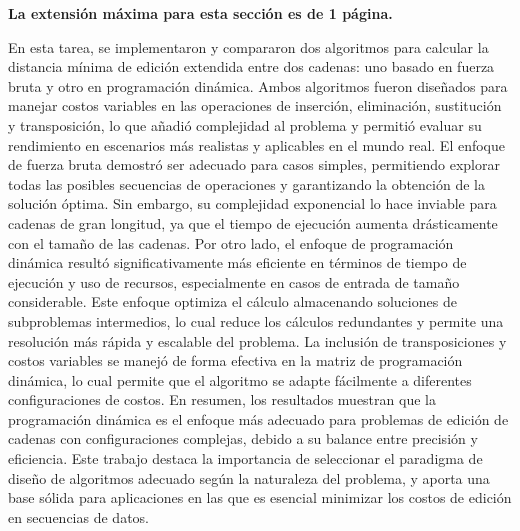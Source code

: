 \begin{mdframed}
    \textbf{La extensión máxima para esta sección es de 1 página.}
\end{mdframed}

En esta tarea, se implementaron y compararon dos algoritmos para calcular la distancia mínima de edición extendida entre dos cadenas: uno basado en fuerza bruta y otro en programación dinámica. Ambos algoritmos fueron diseñados para manejar costos variables en las operaciones de inserción, eliminación, sustitución y transposición, lo que añadió complejidad al problema y permitió evaluar su rendimiento en escenarios más realistas y aplicables en el mundo real.
El enfoque de fuerza bruta demostró ser adecuado para casos simples, permitiendo explorar todas las posibles secuencias de operaciones y garantizando la obtención de la solución óptima. Sin embargo, su complejidad exponencial lo hace inviable para cadenas de gran longitud, ya que el tiempo de ejecución aumenta drásticamente con el tamaño de las cadenas.
Por otro lado, el enfoque de programación dinámica resultó significativamente más eficiente en términos de tiempo de ejecución y uso de recursos, especialmente en casos de entrada de tamaño considerable. Este enfoque optimiza el cálculo almacenando soluciones de subproblemas intermedios, lo cual reduce los cálculos redundantes y permite una resolución más rápida y escalable del problema. La inclusión de transposiciones y costos variables se manejó de forma efectiva en la matriz de programación dinámica, lo cual permite que el algoritmo se adapte fácilmente a diferentes configuraciones de costos.
En resumen, los resultados muestran que la programación dinámica es el enfoque más adecuado para problemas de edición de cadenas con configuraciones complejas, debido a su balance entre precisión y eficiencia. Este trabajo destaca la importancia de seleccionar el paradigma de diseño de algoritmos adecuado según la naturaleza del problema, y aporta una base sólida para aplicaciones en las que es esencial minimizar los costos de edición en secuencias de datos.

